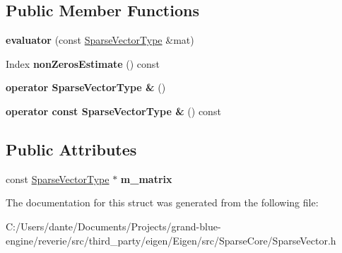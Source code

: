\subsection*{Public Member Functions}
\begin{DoxyCompactItemize}
\item 
\mbox{\label{struct_eigen_1_1internal_1_1evaluator_3_01_sparse_vector_3_01___scalar_00_01___options_00_01___index_01_4_01_4_a63778b30a99166bed54ae17bb5a82275}} 
{\bfseries evaluator} (const \mbox{\hyperlink{class_eigen_1_1_sparse_vector}{Sparse\+Vector\+Type}} \&mat)
\item 
\mbox{\label{struct_eigen_1_1internal_1_1evaluator_3_01_sparse_vector_3_01___scalar_00_01___options_00_01___index_01_4_01_4_aa99ce8e966ecf1a8f019db35dc62027e}} 
Index {\bfseries non\+Zeros\+Estimate} () const
\item 
\mbox{\label{struct_eigen_1_1internal_1_1evaluator_3_01_sparse_vector_3_01___scalar_00_01___options_00_01___index_01_4_01_4_a0e5f88cb7aabb955ae0601df852c2340}} 
{\bfseries operator Sparse\+Vector\+Type \&} ()
\item 
\mbox{\label{struct_eigen_1_1internal_1_1evaluator_3_01_sparse_vector_3_01___scalar_00_01___options_00_01___index_01_4_01_4_adcf04c44e52dd68b45506608fabb7f13}} 
{\bfseries operator const Sparse\+Vector\+Type \&} () const
\end{DoxyCompactItemize}
\subsection*{Public Attributes}
\begin{DoxyCompactItemize}
\item 
\mbox{\label{struct_eigen_1_1internal_1_1evaluator_3_01_sparse_vector_3_01___scalar_00_01___options_00_01___index_01_4_01_4_a2050405e55b54421dc78314dbaadeb2d}} 
const \mbox{\hyperlink{class_eigen_1_1_sparse_vector}{Sparse\+Vector\+Type}} $\ast$ {\bfseries m\+\_\+matrix}
\end{DoxyCompactItemize}


The documentation for this struct was generated from the following file\+:\begin{DoxyCompactItemize}
\item 
C\+:/\+Users/dante/\+Documents/\+Projects/grand-\/blue-\/engine/reverie/src/third\+\_\+party/eigen/\+Eigen/src/\+Sparse\+Core/Sparse\+Vector.\+h\end{DoxyCompactItemize}
